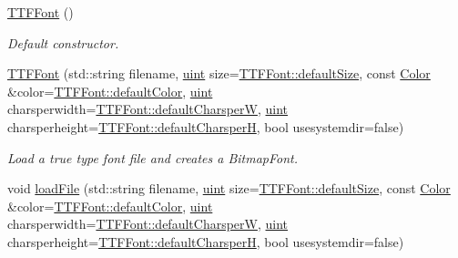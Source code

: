 \begin{DoxyCompactItemize}
\item 
\hypertarget{class_f2_c_1_1_t_t_f_font_a20b84ac1e80b09afe11ee08945f8988a}{
\hyperlink{class_f2_c_1_1_t_t_f_font_a20b84ac1e80b09afe11ee08945f8988a}{TTFFont} ()}
\label{class_f2_c_1_1_t_t_f_font_a20b84ac1e80b09afe11ee08945f8988a}

\begin{DoxyCompactList}\small\item\em Default constructor. \item\end{DoxyCompactList}\item 
\hyperlink{class_f2_c_1_1_t_t_f_font_a772e0ee8e5a58c83d5ad4cadf9cce68b}{TTFFont} (std::string filename, \hyperlink{namespace_f2_c_a58be2bac9eb3e3c99cb41b6008bf4fae}{uint} size=\hyperlink{class_f2_c_1_1_t_t_f_font_a5431854a6264e3b1fcb7f99cde02f1a8}{TTFFont::defaultSize}, const \hyperlink{class_f2_c_1_1_color}{Color} \&color=\hyperlink{class_f2_c_1_1_t_t_f_font_ab7f6ea26f4fb213a32ab1a2df7b201e8}{TTFFont::defaultColor}, \hyperlink{namespace_f2_c_a58be2bac9eb3e3c99cb41b6008bf4fae}{uint} charsperwidth=\hyperlink{class_f2_c_1_1_t_t_f_font_afd75a577433ed3f08eafabe9c49718a0}{TTFFont::defaultCharsperW}, \hyperlink{namespace_f2_c_a58be2bac9eb3e3c99cb41b6008bf4fae}{uint} charsperheight=\hyperlink{class_f2_c_1_1_t_t_f_font_a14b235548ed14123b78d4436956d9639}{TTFFont::defaultCharsperH}, bool usesystemdir=false)
\begin{DoxyCompactList}\small\item\em Load a true type font file and creates a BitmapFont. \item\end{DoxyCompactList}\item 
void \hyperlink{class_f2_c_1_1_t_t_f_font_aa30580b05f41dd87f42339d5d766c4a1}{loadFile} (std::string filename, \hyperlink{namespace_f2_c_a58be2bac9eb3e3c99cb41b6008bf4fae}{uint} size=\hyperlink{class_f2_c_1_1_t_t_f_font_a5431854a6264e3b1fcb7f99cde02f1a8}{TTFFont::defaultSize}, const \hyperlink{class_f2_c_1_1_color}{Color} \&color=\hyperlink{class_f2_c_1_1_t_t_f_font_ab7f6ea26f4fb213a32ab1a2df7b201e8}{TTFFont::defaultColor}, \hyperlink{namespace_f2_c_a58be2bac9eb3e3c99cb41b6008bf4fae}{uint} charsperwidth=\hyperlink{class_f2_c_1_1_t_t_f_font_afd75a577433ed3f08eafabe9c49718a0}{TTFFont::defaultCharsperW}, \hyperlink{namespace_f2_c_a58be2bac9eb3e3c99cb41b6008bf4fae}{uint} charsperheight=\hyperlink{class_f2_c_1_1_t_t_f_font_a14b235548ed14123b78d4436956d9639}{TTFFont::defaultCharsperH}, bool usesystemdir=false)

\end{DoxyCompactItemize}
